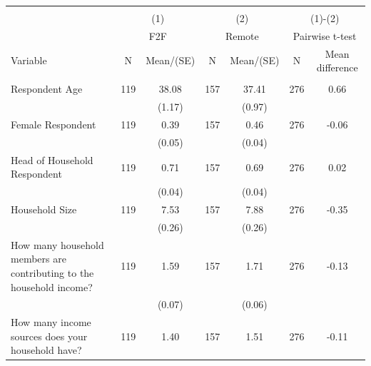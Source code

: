 
\begin{tabular}{@{\extracolsep{5pt}}lcccccc}
\\[-1.8ex]\hline \hline \\[-1.8ex]
 & \multicolumn{2}{c}{(1)}  & \multicolumn{2}{c}{(2)}  & \multicolumn{2}{c}{(1)-(2)} \\
 & \multicolumn{2}{c}{F2F}  & \multicolumn{2}{c}{Remote}  & \multicolumn{2}{c}{Pairwise t-test}  \\
Variable & N & Mean/(SE) & N & Mean/(SE) & N & Mean difference \\ \hline \\[-1.8ex] 
Respondent Age   & 119    & 38.08    & 157    & 37.41    & 276    & 0.66   \\
 &   & (1.17)  &   & (0.97)  &   &  \\ [1ex]
Female Respondent   & 119    & 0.39    & 157    & 0.46    & 276    & -0.06   \\
 &   & (0.05)  &   & (0.04)  &   &  \\ [1ex]
Head of Household Respondent   & 119    & 0.71    & 157    & 0.69    & 276    & 0.02   \\
 &   & (0.04)  &   & (0.04)  &   &  \\ [1ex]
Household Size   & 119    & 7.53    & 157    & 7.88    & 276    & -0.35   \\
 &   & (0.26)  &   & (0.26)  &   &  \\ [1ex]
How many household members are contributing to the household income?   & 119    & 1.59    & 157    & 1.71    & 276    & -0.13   \\
 &   & (0.07)  &   & (0.06)  &   &  \\ [1ex]
How many income sources does your household have?   & 119    & 1.40    & 157    & 1.51    & 276    & -0.11   \\

\end{tabular}
